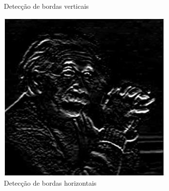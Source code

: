 \documentclass[a4paper, 12pt]{article}
\begin{document}
\begin{figure}[!htb]
		\caption{Detecção de bordas verticais}
  	\endminipage\hspace{1cm}
	  	\includegraphics[width=\linewidth]{images/prewitthori.jpg}
	  	\caption{Detecção de bordas horizontais}
	\endminipage
\end{figure}
\end{document}
